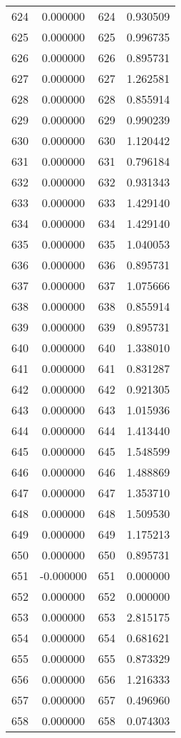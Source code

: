 \documentclass[12pt]{article}
\begin{document}
\begin{longtable}{@{}cccc@{}}
624 & 0.000000 & 624 & 0.930509 \\
625 & 0.000000 & 625 & 0.996735 \\
626 & 0.000000 & 626 & 0.895731 \\
627 & 0.000000 & 627 & 1.262581 \\
628 & 0.000000 & 628 & 0.855914 \\
629 & 0.000000 & 629 & 0.990239 \\
630 & 0.000000 & 630 & 1.120442 \\
631 & 0.000000 & 631 & 0.796184 \\
632 & 0.000000 & 632 & 0.931343 \\
633 & 0.000000 & 633 & 1.429140 \\
634 & 0.000000 & 634 & 1.429140 \\
635 & 0.000000 & 635 & 1.040053 \\
636 & 0.000000 & 636 & 0.895731 \\
637 & 0.000000 & 637 & 1.075666 \\
638 & 0.000000 & 638 & 0.855914 \\
639 & 0.000000 & 639 & 0.895731 \\
640 & 0.000000 & 640 & 1.338010 \\
641 & 0.000000 & 641 & 0.831287 \\
642 & 0.000000 & 642 & 0.921305 \\
643 & 0.000000 & 643 & 1.015936 \\
644 & 0.000000 & 644 & 1.413440 \\
645 & 0.000000 & 645 & 1.548599 \\
646 & 0.000000 & 646 & 1.488869 \\
647 & 0.000000 & 647 & 1.353710 \\
648 & 0.000000 & 648 & 1.509530 \\
649 & 0.000000 & 649 & 1.175213 \\
650 & 0.000000 & 650 & 0.895731 \\
651 & -0.000000 & 651 & 0.000000 \\
652 & 0.000000 & 652 & 0.000000 \\
653 & 0.000000 & 653 & 2.815175 \\
654 & 0.000000 & 654 & 0.681621 \\
655 & 0.000000 & 655 & 0.873329 \\
656 & 0.000000 & 656 & 1.216333 \\
657 & 0.000000 & 657 & 0.496960 \\
658 & 0.000000 & 658 & 0.074303 \\

\end{longtable}
\end{document}
